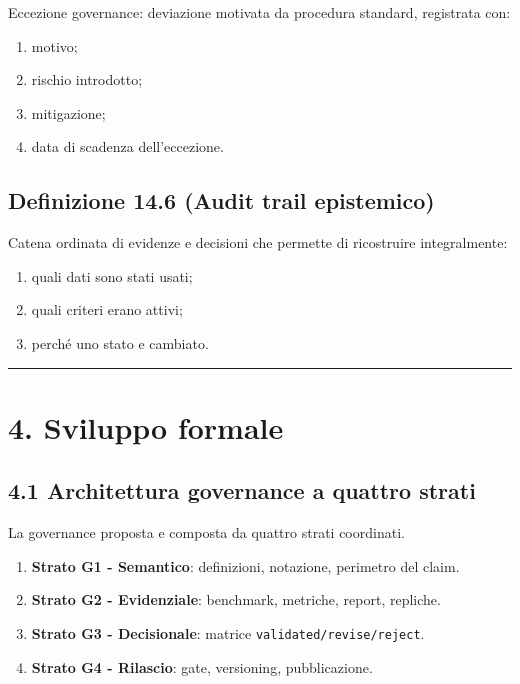 Eccezione governance: deviazione motivata da procedura standard, registrata con:

\begin{enumerate}
\def\labelenumi{\arabic{enumi}.}
\tightlist
\item
  motivo;
\item
  rischio introdotto;
\item
  mitigazione;
\item
  data di scadenza dell'eccezione.
\end{enumerate}

\subsection{Definizione 14.6 (Audit trail epistemico)}

Catena ordinata di evidenze e decisioni che permette di ricostruire integralmente:

\begin{enumerate}
\def\labelenumi{\arabic{enumi}.}
\tightlist
\item
  quali dati sono stati usati;
\item
  quali criteri erano attivi;
\item
  perché uno stato e cambiato.
\end{enumerate}

\begin{center}\rule{0.5\linewidth}{0.5pt}\end{center}

\section{4. Sviluppo formale}

\subsection{4.1 Architettura governance a quattro strati}

La governance proposta e composta da quattro strati coordinati.

\begin{enumerate}
\def\labelenumi{\arabic{enumi}.}
\tightlist
\item
  \textbf{Strato G1 - Semantico}: definizioni, notazione, perimetro del claim.
\item
  \textbf{Strato G2 - Evidenziale}: benchmark, metriche, report, repliche.
\item
  \textbf{Strato G3 - Decisionale}: matrice \texttt{validated/revise/reject}.
\item
  \textbf{Strato G4 - Rilascio}: gate, versioning, pubblicazione.
\end{enumerate}

